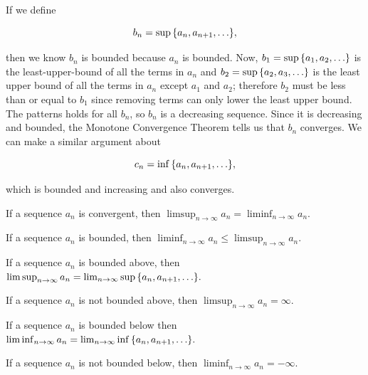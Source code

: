 \documentclass{article}
\begin{document}
If we define

\[ b_n = \sup{\set{a_n, a_{n+1}, \dots}}, \]

then we know $b_n$ is bounded because $a_n$ is bounded. Now, $b_1 = \sup{\set{a_1, a_2, \dots}}$ is the \@{least-upper-bound} of all the terms in $a_n$ and $b_2 = \sup{\set{a_2, a_3, \dots}}$ is the least upper bound of all the terms in $a_n$ except $a_1$ and $a_2$; therefore $b_2$ must be less than or equal to $b_1$ since removing terms can only lower the least upper bound. The patterns holds for all $b_n$, so $b_n$ is a decreasing sequence. Since it is decreasing and bounded, the Monotone Convergence Theorem tells us that $b_n$ converges. We can make a similar argument about

\[ c_n = \inf{\set{a_n, a_{n+1}, \dots}}, \]

which is bounded and increasing and also converges.

If a sequence $a_n$ is convergent, then $\limsup_{n \to \infty}{a_n} = \liminf_{n \to \infty}{a_n}.$

If a sequence $a_n$ is bounded, then $\liminf_{n \to \infty}{a_n} \leq \limsup_{n \to \infty}{a_n}.$

If a sequence $a_n$ is bounded above, then $\limsup_{n \to \infty}{a_n} = \lim_{n \to \infty}\sup{\set{a_n, a_{n+1}, \dots}}.$

If a sequence $a_n$ is not bounded above, then $\limsup_{n \to \infty}{a_n} = \infty.$

If a sequence $a_n$ is bounded below then $\liminf_{n \to \infty}{a_n} = \lim_{n \to \infty}\inf{\set{a_n, a_{n+1}, \dots}}.$

If a sequence $a_n$ is not bounded below, then $\liminf_{n \to \infty}{a_n} = -\infty.$
\end{document}
